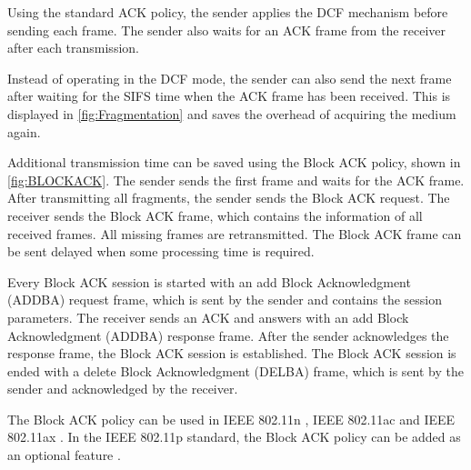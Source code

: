 Using the standard \ac{ACK} policy, the sender applies the \ac{DCF} mechanism before sending each frame.
The sender also waits
for an \ac{ACK} frame from the receiver after each transmission.

Instead of operating in the \ac{DCF} mode, the sender
can also send the next frame after waiting for the \ac{SIFS} time when the \ac{ACK} frame has been received.
This is displayed in \autoref{fig:Fragmentation} and saves the overhead of acquiring the medium again.

Additional transmission time can be saved using the Block \ac{ACK} policy, shown in \autoref{fig:BLOCKACK}.
The sender sends the first frame and waits for the \ac{ACK} frame.
After transmitting all fragments, the sender sends the Block \ac{ACK} request.
The receiver sends the Block \ac{ACK} frame, which contains the information of all received frames.
All missing frames are retransmitted.
The Block \ac{ACK} frame can be sent delayed when some processing time is required.

Every Block \ac{ACK} session is started with an add Block Acknowledgment (ADDBA) request frame, which is sent by the sender and
contains the session parameters.
The receiver sends an \ac{ACK} and answers with an add Block Acknowledgment (ADDBA) response frame.
After the sender acknowledges the response frame, the Block \ac{ACK} session is established.
The Block \ac{ACK} session is ended with a delete Block Acknowledgment (DELBA) frame, which is sent by the sender and acknowledged by the receiver.

The Block \ac{ACK} policy can be used in IEEE 802.11n \cite{ieee_standard_2009n}, IEEE 802.11ac \cite{ieee_standard_2020} and IEEE 802.11ax \cite{ieee_standard_2021ax}.
In the IEEE 802.11p standard, the Block \ac{ACK} policy can be added as an optional feature \cite{ieee_standard_2010p}.

